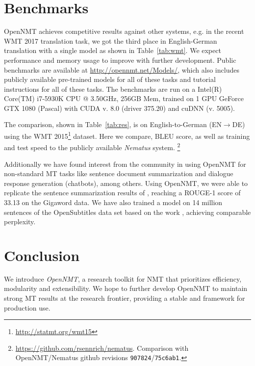 \documentclass[]{article}
\begin{document}
\section{Benchmarks}

OpenNMT achieves competitive results against other systems, e.g. in the recent WMT 2017 translation task, we got the third place in English-German translation with a single model as shown in Table~\ref{tab:wmt}. We expect performance and
memory usage to improve with further development.  Public benchmarks
are available at \url{http://opennmt.net/Models/}, which also includes
publicly available pre-trained models for all of these tasks and
tutorial instructions for all of these tasks. The benchmarks are
run on a Intel(R) Core(TM) i7-5930K CPU @ 3.50GHz, 256GB Mem,
trained on 1 GPU GeForce GTX 1080 (Pascal) with CUDA v. 8.0 (driver
375.20) and cuDNN (v. 5005).

The comparison, shown in Table~\ref{tab:res}, is on English-to-German
(EN$\rightarrow$DE) using the WMT
2015\footnote{\url{http://statmt.org/wmt15}} dataset. Here we compare,
BLEU score, as well as training and test speed to the publicly
available \textit{Nematus} system.
\footnote{\url{https://github.com/rsennrich/nematus}. Comparison with
  OpenNMT/Nematus github revisions {\tt 907824}/{\tt 75c6ab1}.}


Additionally we have found interest from the community in using
OpenNMT for non-standard MT tasks like sentence document summarization and
dialogue response generation (chatbots), among others.  Using
OpenNMT, we were able to replicate the sentence summarization results
of \citet{chopra2016abstractive}, reaching a ROUGE-1 score of 33.13 on
the Gigaword data. We have also trained a model on 14 million
sentences of the OpenSubtitles data set based on the work
\citet{vinyals2015neural}, achieving comparable perplexity.













\section{Conclusion}

We introduce \textit{OpenNMT}, a research toolkit for NMT that
prioritizes efficiency, modularity and extensibility. We hope to further develop
OpenNMT to maintain strong MT results at the research frontier,
providing a stable and framework for production use.
\newpage
\small



\end{document}
